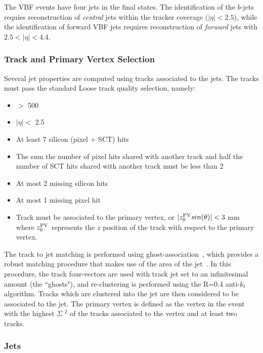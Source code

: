 \label{sec:vbf-objsel}

The VBF \Hbb events have four jets in the final states.
The identification of the $b$-jets requies reconstruction of
{\it central} jets within the tracker coverage ($|\eta|<2.5$), while
the identification of forward VBF jets requires reconstruction
of {\it forward} jets with $2.5<|\eta|<4.4$. 


\subsubsection{Track and Primary Vertex Selection}

Several jet properties are computed using tracks associated to the jets. The tracks must pass the standard Loose track quality selection, namely:

\begin{itemize}
\item \pT $>$ 500 \mev
\item $|\eta| < $ 2.5
\item At least 7 silicon (pixel + SCT) hits
\item The sum the number of pixel hits shared with another track and half the number of SCT hits shared with another track must be less than 2
\item At most 2 missing silicon hits
\item At most 1 missing pixel hit
\item Track must be associated to the primary vertex, or $|z_0^{\rm PV}sin(\theta)| < 3$ mm  where $z_0^{\rm PV}$ represents the $z$ position of the track with respect to the primary vertex.
\end{itemize}

The track to jet matching is performed using ghost-association~\cite{GhostMatching,jetareas,atlasjetsub}, which provides a robust matching procedure that makes use of the area of the jet~\cite{GhostMatching}. In this procedure, the track four-vectors are used with track jet \pT set to an infinitesimal amount (the ``ghosts"), and re-clustering is performed using the R=0.4 anti-$k_t$
algorithm.  Tracks which are clustered into the jet are then considered to be associated to the jet.  
The primary vertex is defined as the vertex in the event with the highest $\Sigma$ \pT$^2$ of the tracks associated to the vertex and at least two tracks.


\subsubsection{Jets}
\label{sec:vbf-jets}

